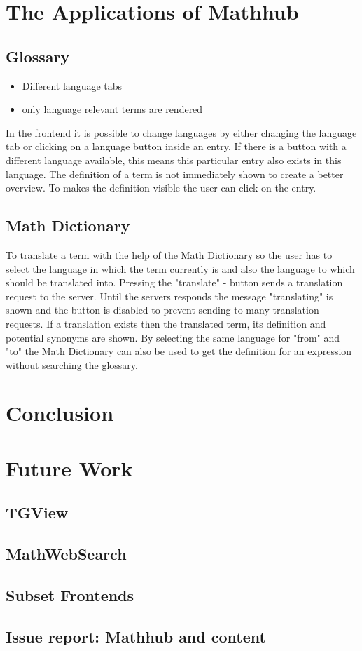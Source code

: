\documentclass[11pt,a4paper]{article}
\begin{document}
\section{The Applications of Mathhub}
	\subsection{Glossary}
\begin{itemize}
\item Different language tabs
\item only language relevant terms are rendered
\end{itemize}
In the frontend it is possible to change languages by either changing the language tab or clicking on a language button inside an entry. If there is a button with a different language available, this means this particular entry also exists in this language. The definition of a term is not immediately shown to create a better overview. To makes the definition visible the user can click on the entry. 

 	\subsection{Math Dictionary}
To translate a term with the help of the Math Dictionary so the user has to select the language in which the term currently is and also the language to which should be translated into. Pressing the "translate" - button sends a translation request to the server. Until the servers responds the message "translating" is shown and the button is disabled to prevent sending to many translation requests. If a translation exists then the translated term, its definition and potential synonyms are shown.
By selecting the same language for "from" and "to" the Math Dictionary can also be used to get the definition for an expression without searching the glossary.

\section{Conclusion}

\section{Future Work}
	\subsection{TGView}
	\subsection{MathWebSearch}
	\subsection{Subset Frontends}
	\subsection{Issue report: Mathhub and content}

\printbibliography
{}
\end{document}
